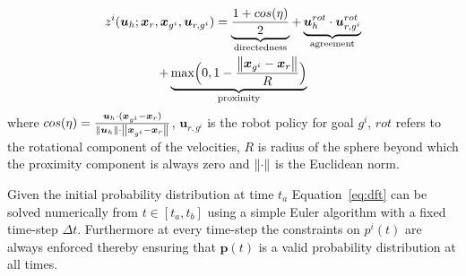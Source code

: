 \begin{multline}
z^i(\boldsymbol{u}_h;\boldsymbol{x}_r, \boldsymbol{x}_{g^i}, \boldsymbol{u}_{r, g^i}) = \underbrace{\frac{1 + cos(\eta)}{2}}_{\text{directedness}} + \underbrace{\boldsymbol{u}_{h}^{rot}\cdot\boldsymbol{u}_{r,g^i}^{rot}}_{\text{agreement}}\\
+ \underbrace{\text{max}\Big(0, 1-\frac{\left\lVert\boldsymbol{x}_{g^i} - \boldsymbol{x}_r\right\rVert}{R}\Big)}_{\text{proximity}}
\end{multline}
where $cos(\eta) =  \frac{\boldsymbol{u}_h\cdot(\boldsymbol{x}_{g^i} - \boldsymbol{x}_r)}{\left\lVert\boldsymbol{u}_h\right\rVert\cdot\left\lVert\boldsymbol{x}_{g^i} - \boldsymbol{x}_r\right\rVert}$, $\boldsymbol{u}_{r, g^i}$ is the robot policy for goal $g^i$, $rot$ refers to the rotational component of the velocities,  $R$ is radius of the sphere beyond which the proximity component is always zero and $\left\lVert\cdot\right\rVert$ is the Euclidean norm. 

Given the initial probability distribution at time $t_a$ Equation~\ref{eq:dft} can be solved numerically from $t \in [t_a, t_b]$ using a simple Euler algorithm with a fixed time-step $\Delta t$. Furthermore at every time-step the constraints on $p^i(t)$ are always enforced thereby ensuring that $\boldsymbol{p}(t)$ is a valid probability distribution at all times. 
	
